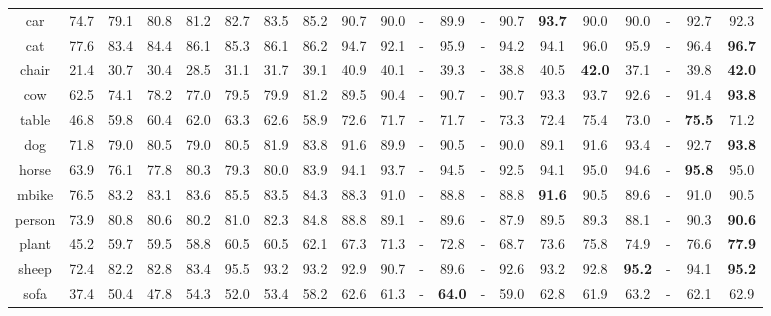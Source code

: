 \documentclass[10pt,journal,cspaper,compsoc]{IEEEtran}
\begin{document}
\begin{table*}[t]
\begin{tabular}{c|c|c|c|c|c|c|c|c|c|c|c|c|c|c|c|c|c|c|c}
			car & 74.7 & 79.1 & 80.8 & 81.2 & 82.7 & 83.5 & 85.2 & 90.7 & 90.0 & - & 89.9 & - & 90.7 & \textbf{93.7} & 90.0 & 90.0 & - & 92.7 & 92.3 \\
			
			cat & 77.6 & 83.4 & 84.4 & 86.1 & 85.3 & 86.1 & 86.2 & 94.7 & 92.1 & - & 95.9 & - & 94.2 & 94.1 & 96.0 & 95.9 & - & 96.4 & \textbf{96.7} \\
			
			chair & 21.4 & 30.7 & 30.4 & 28.5 & 31.1 & 31.7 & 39.1 & 40.9 & 40.1 & - & 39.3 & - & 38.8 & 40.5 & \textbf{42.0} & 37.1 & - & 39.8 & \textbf{42.0} \\
			
			cow & 62.5 & 74.1 & 78.2 & 77.0 & 79.5 & 79.9 & 81.2 & 89.5 & 90.4 & - & 90.7 & - & 90.7 & 93.3 & 93.7 & 92.6 & - & 91.4 & \textbf{93.8} \\
			
			table & 46.8 & 59.8 & 60.4 & 62.0 & 63.3 & 62.6 & 58.9 & 72.6 & 71.7 & - & 71.7 & - & 73.3 & 72.4 & 75.4 & 73.0 & - & \textbf{75.5} & 71.2 \\
			
			dog & 71.8 & 79.0 & 80.5 & 79.0 & 80.5 & 81.9 & 83.8 & 91.6 & 89.9 & - & 90.5 & - & 90.0 & 89.1 & 91.6 & 93.4 & - & 92.7 & \textbf{93.8} \\
			
			horse & 63.9 & 76.1 & 77.8 & 80.3 & 79.3 & 80.0 & 83.9 & 94.1 & 93.7 & - & 94.5 & - & 92.5 & 94.1 & 95.0 & 94.6 & - & \textbf{95.8} & 95.0 \\
			
			mbike & 76.5 & 83.2 & 83.1 & 83.6 & 85.5 & 83.5 & 84.3 & 88.3 & 91.0 & - & 88.8 & - & 88.8 & \textbf{91.6} & 90.5 & 89.6 & - & 91.0 & 90.5 \\
			
			person & 73.9 & 80.8 & 80.6 & 80.2 & 81.0 & 82.3 & 84.8 & 88.8 & 89.1 & - & 89.6 & - & 87.9 & 89.5 & 89.3 & 88.1 & - & 90.3 & \textbf{90.6} \\
			
			plant & 45.2 & 59.7 & 59.5 & 58.8 & 60.5 & 60.5 & 62.1 & 67.3 & 71.3 & - & 72.8 & - & 68.7 & 73.6 & 75.8 & 74.9 & - & 76.6 & \textbf{77.9} \\
			
			sheep & 72.4 & 82.2 & 82.8 & 83.4 & 95.5 & 93.2 & 93.2 & 92.9 & 90.7 & - & 89.6 & - & 92.6 & 93.2 & 92.8 & \textbf{95.2} & - & 94.1 & \textbf{95.2} \\
			
			sofa & 37.4 & 50.4 & 47.8 & 54.3 & 52.0 & 53.4 & 58.2 & 62.6 & 61.3 & - & \textbf{64.0} & - & 59.0 & 62.8 & 61.9 & 63.2 & - & 62.1 & 62.9 \\
			

\end{tabular}
\end{table*}
\end{document}
